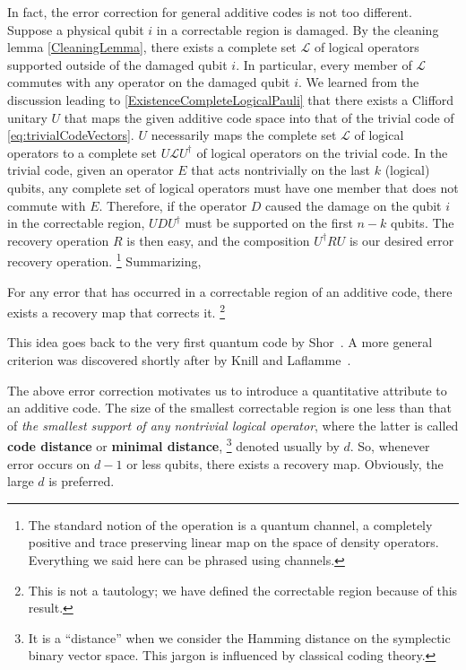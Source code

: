 In fact, the error correction for general additive codes is not too different.
Suppose a physical qubit $i$ in a correctable region is damaged.
By the cleaning lemma \ref{CleaningLemma},
there exists a complete set $\mathcal L$ 
of logical operators supported outside of the damaged qubit $i$.
In particular, every member of $\mathcal L$
commutes with any operator on the damaged qubit $i$.
We learned from the discussion leading to \ref{ExistenceCompleteLogicalPauli}
that there exists a Clifford unitary $U$ that maps the given additive code space
into that of the trivial code of \eqref{eq:trivialCodeVectors}.
$U$ necessarily maps the complete set $\mathcal L$ of logical operators
to a complete set $U \mathcal L U^\dagger$ of logical operators
on the trivial code.
In the trivial code, given an operator $E$ that acts nontrivially on the last $k$ (logical) qubits,
any complete set of logical operators must have one member
that does not commute with $E$. 
Therefore, if the operator $D$ caused the damage on the qubit $i$ in the correctable region,
$U D U^\dagger$ must be supported on the first $n-k$ qubits.
The recovery operation $R$ is then easy,
and the composition $U^\dagger R U$
is our desired error recovery operation.%
\footnote{
The standard notion of the operation
is a quantum channel, a completely positive and trace preserving linear map
on the space of density operators.
Everything we said here can be phrased using channels.
}
Summarizing,
\begin{thm}
For any error that has occurred in a correctable region of an additive code,
there exists a recovery map that corrects it.%
\footnote{
This is not a tautology; we have defined the correctable region because of this result.
}
\end{thm}
This idea goes back to the very first quantum code by Shor~\cite{Shor1996Fault-tolerant}.
A more general criterion was discovered shortly after by Knill and Laflamme~\cite{KnillLaflamme1997Theory}.

The above error correction motivates us to introduce a quantitative attribute to an additive code.
The size of the smallest correctable region is one less than that of
{\em the smallest support of any nontrivial
logical operator}, where the latter is called {\bf code distance} or {\bf minimal distance},%
\footnote{
It is a ``distance'' when we consider the Hamming distance
on the symplectic binary vector space.
This jargon is influenced by classical coding theory.
}
denoted usually by $d$.
So, whenever error occurs on $d-1$ or less qubits, there exists a recovery map.
Obviously, the large $d$ is preferred.

